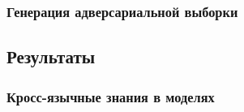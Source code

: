 \subsubsection{Генерация адверсариальной выборки}

\subsection{Результаты}


\subsubsection{Кросс-язычные знания в моделях}


